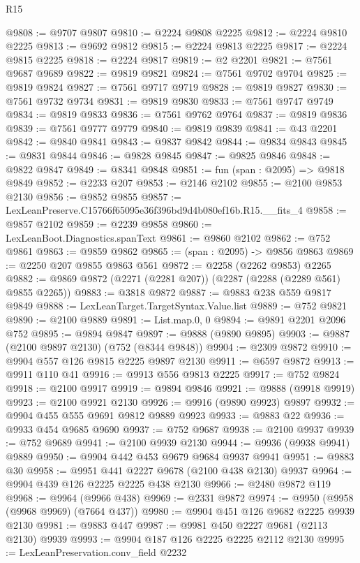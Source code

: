 \begin{lexlean}{R15}
\begin{coremodule}
@9808 := @9707 @9807
@9810 := @2224 @9808 @2225
@9812 := @2224 @9810 @2225
@9813 := @9692 @9812
@9815 := @2224 @9813 @2225
@9817 := @2224 @9815 @2225
@9818 := @2224 @9817
@9819 := @2 @2201
@9821 := @7561 @9687 @9689
@9822 := @9819 @9821
@9824 := @7561 @9702 @9704
@9825 := @9819 @9824
@9827 := @7561 @9717 @9719
@9828 := @9819 @9827
@9830 := @7561 @9732 @9734
@9831 := @9819 @9830
@9833 := @7561 @9747 @9749
@9834 := @9819 @9833
@9836 := @7561 @9762 @9764
@9837 := @9819 @9836
@9839 := @7561 @9777 @9779
@9840 := @9819 @9839
@9841 := @43 @2201
@9842 := @9840 @9841
@9843 := @9837 @9842
@9844 := @9834 @9843
@9845 := @9831 @9844
@9846 := @9828 @9845
@9847 := @9825 @9846
@9848 := @9822 @9847
@9849 := @8341 @9848
@9851 := fun (span : @2095) => @9818 @9849
@9852 := @2233 @207
@9853 := @2146 @2102
@9855 := @2100 @9853 @2130
@9856 := @9852 @9855
@9857 := LexLeanPreserve.C15766f65095e36f396bd9d4b080ef16b.R15.__fits_4
@9858 := @9857 @2102
@9859 := @2239 @9858
@9860 := LexLeanBoot.Diagnostics.spanText
@9861 := @9860 @2102
@9862 := @752 @9861
@9863 := @9859 @9862
@9865 := (span : @2095) -> @9856 @9863
@9869 := @2250 @207 @9855 @9863 @561
@9872 := @2258 (@2262 @9853) @2265
@9882 := @9869 @9872 (@2271 (@2281 @207)) (@2287 (@2288 (@2289 @561) @9855 @2265))
@9883 := @3818 @9872
@9887 := @9883 @238 @559 @9817 @9849
@9888 := LexLeanTarget.TargetSyntax.Value.list
@9889 := @752 @9821
@9890 := @2100 @9889
@9891 := List.map.{0, 0}
@9894 := @9891 @2201 @2096 @752
@9895 := @9894 @9847
@9897 := @9888 (@9890 @9895)
@9903 := @9887 (@2100 @9897 @2130) (@752 (@8344 @9848))
@9904 := @2309 @9872
@9910 := @9904 @557 @126 @9815 @2225 @9897 @2130
@9911 := @6597 @9872
@9913 := @9911 @110 @41
@9916 := @9913 @556 @9813 @2225
@9917 := @752 @9824
@9918 := @2100 @9917
@9919 := @9894 @9846
@9921 := @9888 (@9918 @9919)
@9923 := @2100 @9921 @2130
@9926 := @9916 (@9890 @9923) @9897
@9932 := @9904 @455 @555 @9691 @9812 @9889 @9923
@9933 := @9883 @22
@9936 := @9933 @454 @9685 @9690
@9937 := @752 @9687
@9938 := @2100 @9937
@9939 := @752 @9689
@9941 := @2100 @9939 @2130
@9944 := @9936 (@9938 @9941) @9889
@9950 := @9904 @442 @453 @9679 @9684 @9937 @9941
@9951 := @9883 @30
@9958 := @9951 @441 @2227 @9678 (@2100 @438 @2130) @9937
@9964 := @9904 @439 @126 @2225 @2225 @438 @2130
@9966 := @2480 @9872 @119
@9968 := @9964 (@9966 @438)
@9969 := @2331 @9872
@9974 := @9950 (@9958 (@9968 @9969) (@7664 @437))
@9980 := @9904 @451 @126 @9682 @2225 @9939 @2130
@9981 := @9883 @447
@9987 := @9981 @450 @2227 @9681 (@2113 @2130) @9939
@9993 := @9904 @187 @126 @2225 @2225 @2112 @2130
@9995 := LexLeanPreservation.conv_field @2232

\end{coremodule}
\end{lexlean}
